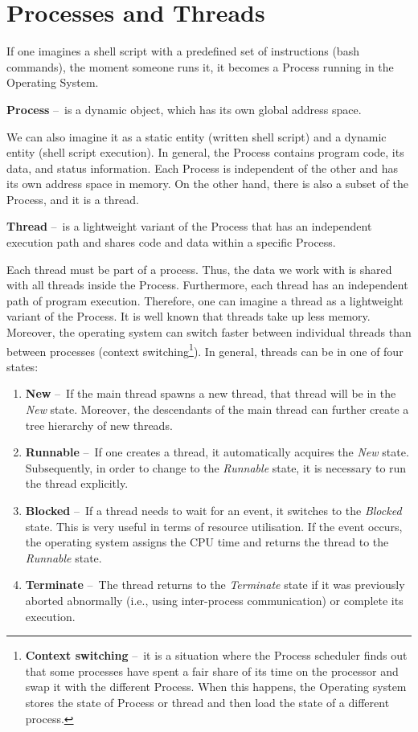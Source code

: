 \section{Processes and Threads}
\label{04:processesandthreads}

If one imagines a shell script with a predefined set of instructions (bash commands), the moment someone runs it, it becomes a Process running in the Operating System.
\begin{definition}
    \textbf{Process} \---\ is a dynamic object, which has its own global address space.
\end{definition}
We can also imagine it as a static entity (written shell script) and a dynamic entity (shell script execution). In general, the Process contains program code, its data, and status information. Each Process is independent of the other and has its own address space in memory. On the other hand, there is also a subset of the Process, and it is a thread.
\begin{definition}
    \textbf{Thread} \---\ is a lightweight variant of the Process that has an independent execution path and shares code and data within a specific Process.
\end{definition}
Each thread must be part of a process. Thus, the data we work with is shared with all threads inside the Process. Furthermore, each thread has an independent path of program execution. Therefore, one can imagine a thread as a lightweight variant of the Process. It is well known that threads take up less memory. Moreover, the operating system can switch faster between individual threads than between processes (context switching\footnote {\textbf{Context switching} \---\ it is a situation where the Process scheduler finds out that some processes have spent a fair share of its time on the processor and swap it with the different Process. When this happens, the Operating system stores the state of Process or thread and then load the state of a different process.}). In general, threads can be in one of four states:
\begin{enumerate}[itemsep=1mm, parsep=0pt]
    \item \textbf{New} \---\ If the main thread spawns a new thread, that thread will be in the \emph{New} state. Moreover, the descendants of the main thread can further create a tree hierarchy of new threads.
    \item \textbf{Runnable} \---\ If one creates a thread, it automatically acquires the \emph{New} state. Subsequently, in order to change to the \emph{Runnable} state, it is necessary to run the thread explicitly.
    \item \textbf {Blocked} \---\ If a thread needs to wait for an event, it switches to the \emph{Blocked} state. This is very useful in terms of resource utilisation. If the event occurs, the operating system assigns the CPU time and returns the thread to the \emph{Runnable} state.
    \item \textbf{Terminate} \---\ The thread returns to the \emph {Terminate} state if it was previously aborted abnormally (i.e., using inter-process communication) or complete its execution.
\end{enumerate}

